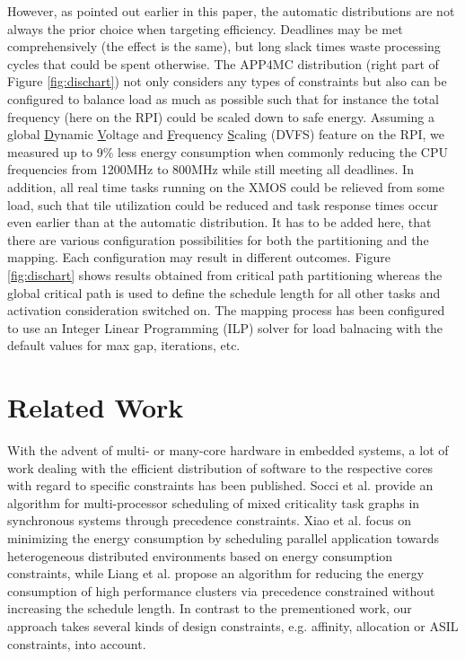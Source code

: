 \documentclass [a4paper,final,conference,10pt]{IDAACS}
\begin{document}
However, as pointed out earlier in this paper, the automatic distributions are not always the prior choice when targeting efficiency. Deadlines may be met comprehensively (the effect is the same), but long slack times waste processing cycles that could be spent otherwise. The APP4MC distribution (right part of Figure \ref{fig:dischart}) not only considers any types of constraints but also can be configured to balance load as much as possible such that for instance the total frequency (here on the RPI) could be scaled down to safe energy. Assuming a global \underline{D}ynamic \underline{V}oltage and \underline{F}requency \underline{S}caling (DVFS) feature on the RPI, we measured up to 9\% less energy consumption when commonly reducing the CPU frequencies from 1200MHz to 800MHz while still meeting all deadlines.  %
In addition, all real time tasks running on the XMOS could be relieved from some load, such that tile utilization could be reduced and task response times occur even earlier than at the automatic distribution. 
It has to be added here, that there are various configuration possibilities for both the partitioning and the mapping. Each configuration may result in different outcomes. Figure \ref{fig:dischart} shows results obtained from critical path partitioning whereas the global critical path is used to define the schedule length for all other tasks and activation consideration switched on. The mapping process has been configured to use an Integer Linear Programming (ILP) solver for load balnacing with the default values for max gap, iterations, etc. 
\section{Related Work}
\label{sec:relatedWork}
With the advent of multi- or many-core hardware in embedded systems, a lot of work dealing with the efficient distribution of software to the respective cores with regard to specific constraints has been published. Socci et al. \cite{Socci2015} provide an algorithm for multi-processor scheduling of mixed criticality task graphs in synchronous systems through precedence constraints. 
Xiao et al. \cite{Xiao2016} focus on minimizing the energy consumption by scheduling parallel application towards heterogeneous distributed environments based on energy consumption constraints, while Liang et al. \cite{LiXi13} propose an algorithm for reducing the energy consumption of high performance clusters via precedence
constrained without increasing the schedule length. In contrast to the prementioned work, our approach takes several kinds of design constraints, e.g. affinity, allocation or ASIL constraints, into account.
\end{document}
